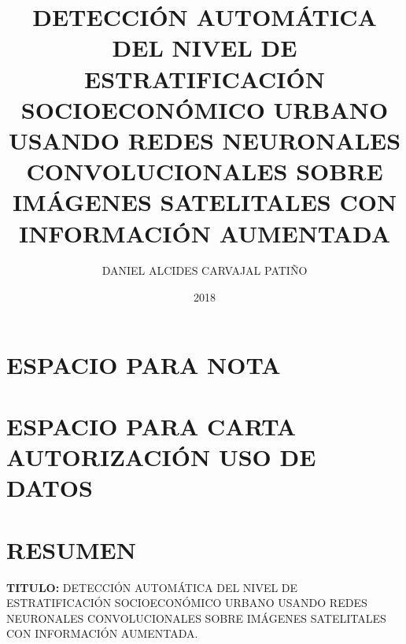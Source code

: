


\usepackage{lipsum}
\usepackage{CJKutf8}



\title{DETECCIÓN AUTOMÁTICA DEL NIVEL DE ESTRATIFICACIÓN SOCIOECONÓMICO URBANO USANDO REDES NEURONALES CONVOLUCIONALES SOBRE IMÁGENES SATELITALES CON INFORMACIÓN AUMENTADA}
\author{DANIEL ALCIDES CARVAJAL PATIÑO}

\date{2018}






	\onehalfspace
	\maketitle
	\chapter*{ESPACIO PARA NOTA}
    \newpage
    \chapter*{ESPACIO PARA CARTA AUTORIZACIÓN USO DE DATOS}
    \newpage
	\tableofcontents
	\newpage \listoffigures
	\newpage \listoftables

	\setlength{\parskip}{\baselineskip} %


	\newpage\chapter*{RESUMEN}
    \textbf{TITULO:} DETECCIÓN AUTOMÁTICA DEL NIVEL DE ESTRATIFICACIÓN SOCIOECONÓMICO URBANO USANDO REDES NEURONALES CONVOLUCIONALES SOBRE IMÁGENES SATELITALES CON INFORMACIÓN AUMENTADA.
    
